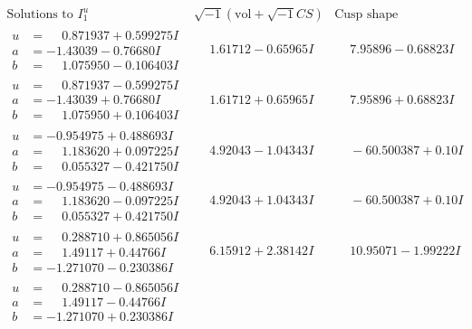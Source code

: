 \documentclass[1p]{elsarticle_modified}
\theoremstyle{definition}
\newcommand{\I}{\sqrt{-1}}
\begin{document}
$$\begin{array}{c|c|c}  
\text{Solutions to }I^u_{1}& \I (\text{vol} + \sqrt{-1}CS) & \text{Cusp shape}\\
 \hline 
\begin{aligned}
u &= \phantom{-}0.871937 + 0.599275 I \\
a &= -1.43039 - 0.76680 I \\
b &= \phantom{-}1.075950 - 0.106403 I\end{aligned}
 & \phantom{-}1.61712 - 0.65965 I & \phantom{-}7.95896 - 0.68823 I \\ \hline\begin{aligned}
u &= \phantom{-}0.871937 - 0.599275 I \\
a &= -1.43039 + 0.76680 I \\
b &= \phantom{-}1.075950 + 0.106403 I\end{aligned}
 & \phantom{-}1.61712 + 0.65965 I & \phantom{-}7.95896 + 0.68823 I \\ \hline\begin{aligned}
u &= -0.954975 + 0.488693 I \\
a &= \phantom{-}1.183620 + 0.097225 I \\
b &= \phantom{-}0.055327 - 0.421750 I\end{aligned}
 & \phantom{-}4.92043 - 1.04343 I & \phantom{-}                -6
0.500387 + 0. 10   I\phantom{ +0.000000I} \\ \hline\begin{aligned}
u &= -0.954975 - 0.488693 I \\
a &= \phantom{-}1.183620 - 0.097225 I \\
b &= \phantom{-}0.055327 + 0.421750 I\end{aligned}
 & \phantom{-}4.92043 + 1.04343 I & \phantom{-}                -6
0.500387 + 0. 10   I\phantom{ +0.000000I} \\ \hline\begin{aligned}
u &= \phantom{-}0.288710 + 0.865056 I \\
a &= \phantom{-}1.49117 + 0.44766 I \\
b &= -1.271070 - 0.230386 I\end{aligned}
 & \phantom{-}6.15912 + 2.38142 I & \phantom{-}10.95071 - 1.99222 I \\ \hline\begin{aligned}
u &= \phantom{-}0.288710 - 0.865056 I \\
a &= \phantom{-}1.49117 - 0.44766 I \\
b &= -1.271070 + 0.230386 I\end{aligned}

\end{array}$$
\end{document}
